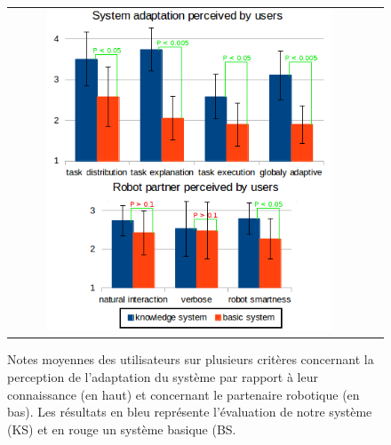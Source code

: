 \documentclass[a4paper,11pt,twoside]{StyleThese}
\begin{document}
 \begin{figure}[ht!]

 \centering
 \begin{tabular}{cc}
  \includegraphics[width=0.81\textwidth]{img/respvalue3.png}
 \end{tabular}
 \caption{Notes moyennes des utilisateurs sur plusieurs critères concernant la perception de l'adaptation du système par rapport à leur connaissance  (en haut) et concernant le partenaire robotique (en bas). Les résultats en bleu représente l'évaluation de notre système (KS) et en rouge un système basique (BS.}
 \label{fig:results}
 \end{figure}
\end{document}
